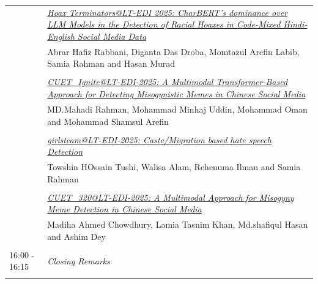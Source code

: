 \documentclass[11pt,oneside]{book}
\begin{document}
\begin{tabular}{p{24mm}p{124mm}}
                      & \hyperlink{page.159}{\emph{Hoax Terminators@LT-EDI 2025: CharBERT's dominance over LLM Models in the Detection of Racial Hoaxes in Code-Mixed Hindi-English Social Media Data}}\\
        & Abrar Hafiz Rabbani\index{Rabbani}, Diganta Das Droba\index{Droba}, Momtazul Arefin Labib\index{Labib}, Samia Rahman\index{Rahman} and Hasan Murad\index{Murad}\\\\
                
                      & \hyperlink{page.171}{\emph{CUET\_Ignite@LT-EDI-2025: A Multimodal Transformer-Based Approach for Detecting Misogynistic Memes in Chinese Social Media}}\\
        & MD.Mahadi Rahman\index{Rahman}, Mohammad Minhaj Uddin\index{Uddin}, Mohammad Oman\index{Oman} and Mohammad Shamsul Arefin\index{Arefin}\\\\
                
                      & \hyperlink{page.177}{\emph{girlsteam@LT-EDI-2025: Caste/Migration based hate speech Detection}}\\
        & Towshin HOssain Tushi\index{Tushi}, Walisa Alam\index{Alam}, Rehenuma Ilman\index{Ilman} and Samia Rahman\index{Rahman}\\\\
                
                      & \hyperlink{page.183}{\emph{CUET\_320@LT-EDI-2025: A Multimodal Approach for Misogyny Meme Detection in Chinese Social Media}}\\
        & Madiha Ahmed Chowdhury\index{Chowdhury}, Lamia Tasnim Khan\index{Khan}, Md.shafiqul Hasan\index{Hasan} and Ashim Dey\index{Dey}\\\\
                      16:00 - 16:15 & \emph{Closing Remarks}\\\\
      
              \end{tabular}
    \newpage
      
\end{document}
